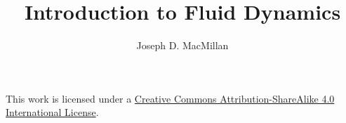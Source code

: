 \documentclass[10pt, a5paper, twoside, openany]{memoir}
\title{Introduction to Fluid Dynamics}
\author{Joseph D. MacMillan}
\date{}
\begin{document}
\maketitle

{\small This work is licensed under a \href{https://creativecommons.org/licenses/by-sa/4.0/}{Creative Commons Attribution-ShareAlike 4.0 International License}.}



\newpage

\tableofcontents

















%
\end{document}
